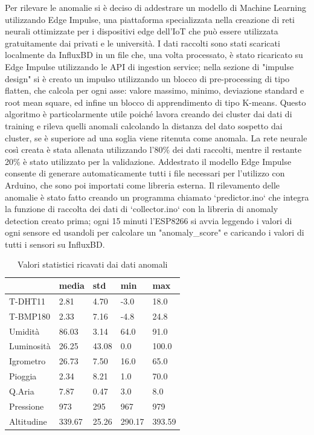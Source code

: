 \documentclass[fleqn, 10pt]{SelfArx}
\begin{document}
Per rilevare le anomalie si è deciso di addestrare un modello di Machine Learning utilizzando Edge Impulse\cite{edgeimpulse}, una piattaforma specializzata nella creazione di reti neurali ottimizzate per i dispositivi edge dell'IoT che
può essere utilizzata gratuitamente dai privati e le università. I dati raccolti sono stati scaricati localmente da InfluxBD in un file che, una volta processato, è stato ricaricato su Edge Impulse utilizzando le API di 
ingestion service\cite{eiapi}; nella sezione di "impulse design" si è creato un impulso utilizzando un blocco di pre-processing di tipo flatten, che calcola per ogni asse: valore massimo, 
minimo, deviazione standard e root mean square, ed infine un blocco di apprendimento di tipo K-means. Questo algoritmo è particolarmente utile poiché lavora creando dei cluster dai dati di training e rileva quelli anomali
calcolando la distanza del dato sospetto dai cluster, se è superiore ad una soglia viene ritenuta come anomala.
La rete neurale così creata è stata allenata utilizzando l'80\% dei dati raccolti, mentre il restante 20\% è stato utilizzato per la validazione. Addestrato il modello Edge Impulse consente di generare automaticamente
tutti i file necessari per l'utilizzo con Arduino, che sono poi importati come libreria esterna. Il rilevamento delle anomalie è stato fatto creando un programma chiamato `predictor.ino` che integra la funzione di raccolta 
dei dati di `collector.ino` con la libreria di anomaly detection creato prima; ogni 15 minuti l'ESP8266 si avvia leggendo i valori di ogni sensore ed usandoli per calcolare un "anomaly\_score" e caricando i valori di tutti i 
sensori su InfluxBD.

\begin{table}[h!]
  \centering
  \small
  \begin{tabular}{ l l l l l }
    \hline
     & media & std & min & max \\
    \hline
    T-DHT11 & 2.81 & 4.70 & -3.0 & 18.0 \\
    T-BMP180 & 2.33 & 7.16 & -4.8 & 24.8 \\
    Umidità & 86.03 & 3.14 & 64.0 & 91.0 \\
    Luminosità & 26.25 & 43.08 & 0.0 & 100.0 \\
    Igrometro & 26.73 & 7.50 & 16.0 & 65.0 \\
    Pioggia & 2.34 & 8.21 & 1.0 & 70.0 \\
    Q.Aria & 7.87 & 0.47 & 3.0 & 8.0 \\
    Pressione & 973 & 295 & 967 & 979 \\
    Altitudine & 339.67 & 25.26 & 290.17 & 393.59 \\
    \hline
  \end{tabular}
  \caption{Valori statistici ricavati dai dati anomali}
  \label{tab:anomalies}
\end{table}
\end{document}
